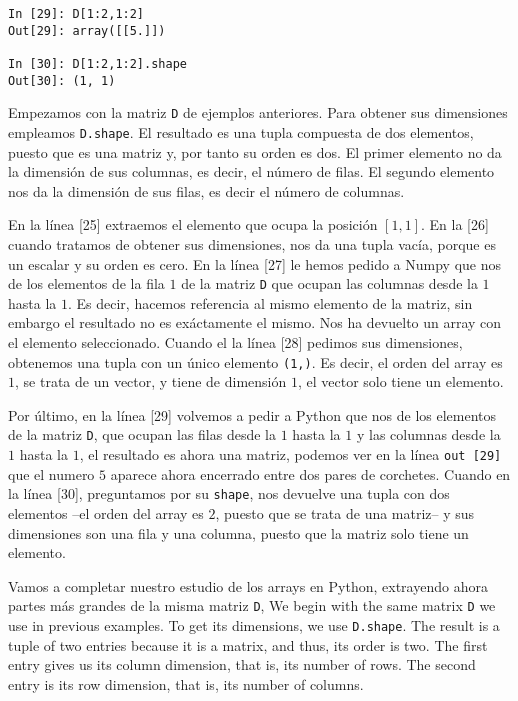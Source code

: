 \begin{center}
    \begin{minipage}{0.3\textwidth}
    \begin{verbatim}
In [29]: D[1:2,1:2]
Out[29]: array([[5.]])

In [30]: D[1:2,1:2].shape
Out[30]: (1, 1)
    \end{verbatim}
        
    \end{minipage}
\end{center}

 \begin{paracol}{2}
 Empezamos con la matriz \texttt{D} de ejemplos anteriores. Para obtener sus dimensiones empleamos \texttt{D.shape}. El resultado es una tupla compuesta de dos elementos, puesto que es una matriz y, por tanto su orden es dos. El primer elemento no da la dimensión de sus columnas, es decir, el número de filas. El segundo elemento nos da la dimensión de sus filas, es decir el número de columnas. 
 
 En la línea [25] extraemos el elemento que ocupa la posición $[1,1]$. En la [26] cuando tratamos de obtener sus dimensiones, nos da una tupla vacía, porque es un escalar y su orden es cero. En la línea [27] le hemos pedido a Numpy que nos de los elementos de la fila $1$ de la matriz \texttt{D} que ocupan las columnas desde la $1$ hasta la $1$. Es decir, hacemos referencia al mismo elemento de la matriz, sin embargo el resultado no es exáctamente el mismo. Nos ha devuelto un array con el elemento seleccionado. Cuando el la línea [28] pedimos sus dimensiones, obtenemos una tupla con un único elemento \texttt{(1,)}. Es decir, el orden del array es $1$, se trata de un vector, y tiene de dimensión $1$, el vector solo tiene un elemento. 
 
 Por último, en la línea [29] volvemos a pedir a Python que nos de los elementos de la matriz \texttt{D}, que ocupan las filas desde la $1$ hasta la $1$ y las columnas desde la $1$ hasta la $1$, el resultado es ahora una matriz, podemos ver en la línea \texttt{out [29]} que el numero $5$ aparece ahora encerrado entre dos pares de corchetes. Cuando en la línea [30], preguntamos por su \texttt{shape}, nos devuelve una tupla con dos elementos --el orden del array es $2$, puesto que se trata de una matriz-- y sus dimensiones son una fila y una columna, puesto que la matriz solo tiene un elemento.  

 Vamos a completar nuestro estudio de los arrays en Python, extrayendo ahora partes más grandes de la misma matriz \texttt{D},
 \switchcolumn
 We begin with the same matrix \texttt{D} we use in previous examples. To get its dimensions, we use \texttt{D.shape}. The result is a tuple of two entries because it is a matrix, and thus, its order is two. The first entry gives us its column dimension, that is, its number of rows. The second entry is its row dimension, that is, its number of columns.


\end{paracol}
